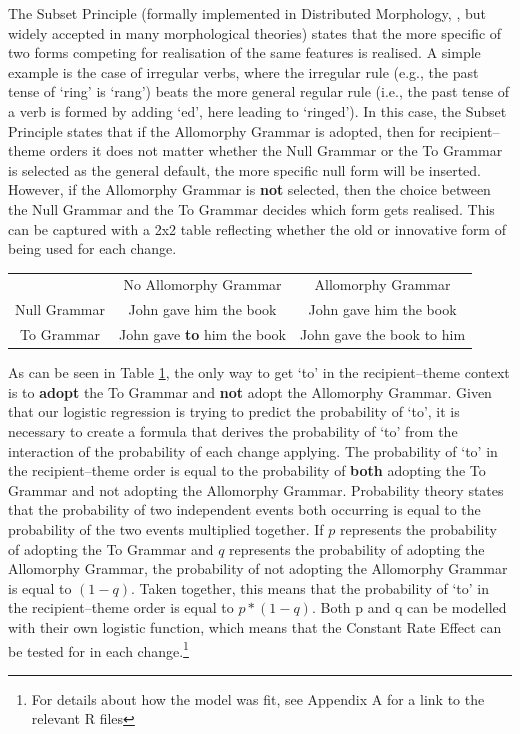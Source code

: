 	The Subset Principle (formally implemented in Distributed Morphology, \citealt{Halle.1993}, but widely accepted in many morphological theories) states that the more specific of two forms competing for realisation of the same features is realised. A simple example is the case of irregular verbs, where the irregular rule (e.g., the past tense of `ring' is `rang') beats the more general regular rule (i.e., the past tense of a verb is formed by adding `ed', here leading to `ringed'). In this case, the Subset Principle states that if the Allomorphy Grammar is adopted, then for recipient--theme orders it does not matter whether the Null Grammar or the To Grammar is selected as the general default, the more specific null form will be inserted. However, if the Allomorphy Grammar is \textbf{not} selected, then the choice between the Null Grammar and the To Grammar decides which form gets realised. This can be captured with a 2x2 table reflecting whether the old or innovative form of being used for each change.

	\begin{table}
		\begin{tabular}{ccc}
					& No Allomorphy Grammar & Allomorphy Grammar\\
			Null Grammar	& John gave him the book & John gave him the book\\
			To Grammar	& John gave \textbf{to} him the book & John gave the book to him\\
		\end{tabular}
		\label{tab:2x2int}
	\end{table}

	As can be seen in Table \ref{tab:2x2int}, the only way to get `to' in the recipient--theme context is to \textbf{adopt} the To Grammar and \textbf{not} adopt the Allomorphy Grammar. Given that our logistic regression is trying to predict the probability of `to', it is necessary to create a formula that derives the probability of `to' from the interaction of the probability of each change applying. The probability of `to' in the recipient--theme order is equal to the probability of \textbf{both} adopting the To Grammar and not adopting the Allomorphy Grammar. Probability theory states that the probability of two independent events both occurring is equal to the probability of the two events multiplied together. If $p$ represents the probability of adopting the To Grammar and $q$ represents the probability of adopting the Allomorphy Grammar, the probability of not adopting the Allomorphy Grammar is equal to $(1-q)$. Taken together, this means that the probability of `to' in the recipient--theme order is equal to $p * (1-q)$. Both p and q can be modelled with their own logistic function, which means that the Constant Rate Effect can be tested for in each change.\footnote{For details about how the model was fit, see Appendix A for a link to the relevant R files}


